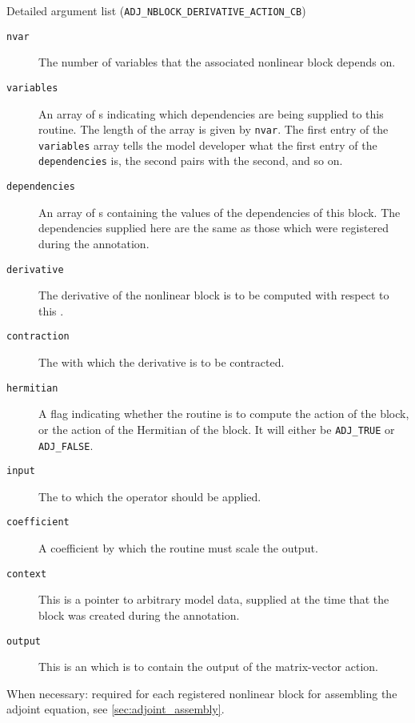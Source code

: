\begin{boxwithtitle}{Detailed argument list (\texttt{ADJ_NBLOCK_DERIVATIVE_ACTION_CB})}
\begin{description}
\item[\texttt{nvar}] The number of variables that the associated nonlinear block depends on.
\item[\texttt{variables}] An array of s indicating which dependencies are being supplied to this routine. The length of the
array is given by \texttt{nvar}. The first entry of the \texttt{variables} array
tells the model developer what the first entry of the \texttt{dependencies} is, the second pairs with the second, and so on.
\item[\texttt{dependencies}] An array of s containing the values of the dependencies of this block. The dependencies supplied
here are the same as those which were registered during the annotation.
\item[\texttt{derivative}] The derivative of the nonlinear block is to be computed with respect to this . 
\item[\texttt{contraction}] The  with which the derivative is to be contracted.  
\item[\texttt{hermitian}] A flag indicating whether the routine is to compute the action of the block, or the action of the Hermitian of the
block. It will either be \texttt{ADJ_TRUE} or \texttt{ADJ_FALSE}.
\item[\texttt{input}] The  to which the operator should be applied.
\item[\texttt{coefficient}] A coefficient by which the routine must scale the output.
\item[\texttt{context}] This is a pointer to arbitrary model data, supplied at the time that the block was created during the annotation.
\item[\texttt{output}] This is an  which is to contain the output of the matrix-vector action.
\end{description}
\end{boxwithtitle}

When necessary: required for each registered nonlinear block for assembling the adjoint equation, see \autoref{sec:adjoint_assembly}.

